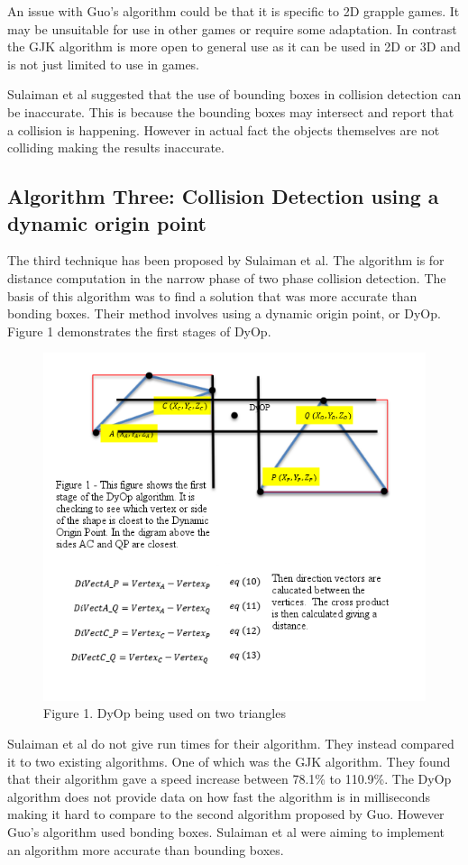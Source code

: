 \documentclass{scrartcl}
\begin{document}
An issue with Guo's algorithm could be that it is specific to 2D grapple games. It may be unsuitable for use in other games or require some adaptation. In contrast the GJK algorithm is more open to general use as it can be used in 2D or 3D and is not just limited to use in games.
	
Sulaiman et al \cite{Sulaiman} suggested that the use of bounding boxes in collision detection can be inaccurate. This is because the bounding boxes may intersect and report that a collision is happening. However in actual fact the objects themselves are not colliding making the results inaccurate.
	
	
\subsection{Algorithm Three: Collision Detection using a dynamic origin point }
The third technique has been proposed by Sulaiman et al\cite{Sulaiman}. The algorithm is for distance computation in the narrow phase of two phase collision detection. The basis of this algorithm was to find a solution that was more accurate than bonding boxes. Their method involves using a dynamic origin point, or DyOp. Figure 1 demonstrates the first stages of DyOp.
\begin{figure}[h]
	\includegraphics[width=1.0\linewidth]{A3figure.png}
	\caption{Figure 1. DyOp being used on two triangles}
\end{figure}
\newline
\newline	
Sulaiman et al do not give run times for their algorithm. They instead compared it to two existing algorithms. One of which was the GJK  algorithm. They found that their algorithm gave a speed increase  between 78.1\% to 110.9\%. The DyOp algorithm does not provide data on how fast the algorithm is in milliseconds making it hard to compare to the second algorithm proposed by Guo. However Guo’s algorithm used bonding boxes. Sulaiman et al were aiming to implement an algorithm more accurate than bounding boxes.
	
\end{document}
